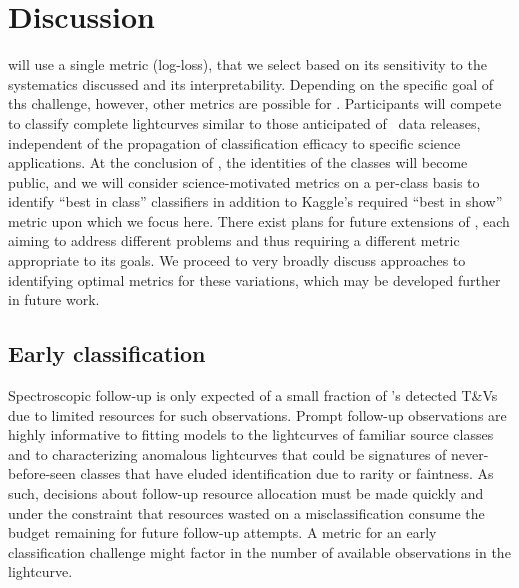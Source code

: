 \section{Discussion}
\label{sec:discussion}

\plasticc will use a single metric (log-loss), that we select based on its sensitivity to the systematics discussed and its interpretability. Depending on the specific goal of ths challenge, however, other metrics are possible for \plasticc. Participants will compete to classify complete lightcurves similar to those anticipated of \lsst\ data releases, independent of the propagation of classification efficacy to specific science applications.
At the conclusion of \plasticc, the identities of the classes will become public, and we will consider science-motivated metrics on a per-class basis to identify ``best in class'' classifiers in addition to Kaggle's required ``best in show'' metric upon which we focus here.
There exist plans for future extensions of \plasticc, each aiming to address different problems and thus requiring a different metric appropriate to its goals.
We proceed to very broadly discuss approaches to identifying optimal metrics for these variations, which may be developed further in future work.

\subsection{Early classification}
\label{sec:early}

Spectroscopic follow-up is only expected of a small fraction of \lsst's detected T\&Vs due to limited resources for such observations.
Prompt follow-up observations are highly informative to fitting models to the lightcurves of familiar source classes and to characterizing anomalous lightcurves that could be signatures of never-before-seen classes that have eluded identification due to rarity or faintness.
As such, decisions about follow-up resource allocation must be made quickly and under the constraint that resources wasted on a misclassification consume the budget remaining for future follow-up attempts.
A metric for an early classification challenge might factor in the number of available observations in the lightcurve.

